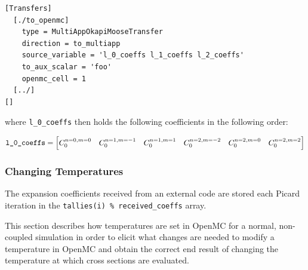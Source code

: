 \documentclass[10pt]{article}
\newcommand{\beq}{\begin{equation}}
\newcommand{\eeq}{\end{equation}}
\numberwithin{equation}{section} %
\begin{document}
\begin{lstlisting}
[Transfers]
  [./to_openmc]
    type = MultiAppOkapiMooseTransfer
    direction = to_multiapp
    source_variable = 'l_0_coeffs l_1_coeffs l_2_coeffs'
    to_aux_scalar = 'foo'
    openmc_cell = 1
  [../]
[]
\end{lstlisting}

where {\tt l\_0\_coeffs} then holds the following coefficients in the following order:

\beq
\textrm{{\tt l\_0\_coeffs}}= \begin{bmatrix}C_0^{n=0,m=0} & C_0^{n=1, m=-1} & C_0^{n=1,m=1} & C_0^{n=2,m=-2} & C_0^{n=2,m=0} & C_0^{n=2,m=2}\end{bmatrix}
\eeq

\subsubsection{Changing Temperatures}
The expansion coefficients received from an external code are stored each Picard iteration in the {\tt tallies(i) \% received\_coeffs} array.

This section describes how temperatures are set in OpenMC for a normal, non-coupled simulation in order to elicit what changes are needed to modify a temperature in OpenMC and obtain the correct end result of changing the temperature at which cross sections are evaluated.
\end{document}
